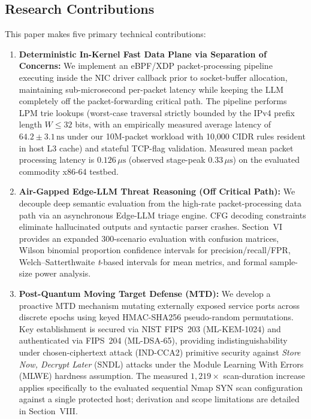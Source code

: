 \documentclass[journal]{IEEEtran}
\renewcommand{\_}{\textunderscore\allowbreak}
\begin{document}
\subsection{Research Contributions}
This paper makes five primary technical contributions:
\begin{enumerate}
  \item \textbf{Deterministic In-Kernel Fast Data Plane via Separation of Concerns:} We implement an
    eBPF/XDP packet-processing pipeline executing inside the NIC driver callback
    prior to socket-buffer allocation, maintaining sub-microsecond per-packet
    latency while keeping the LLM completely off the packet-forwarding critical path.
    The pipeline performs LPM trie lookups (worst-case traversal strictly bounded by the
    IPv4 prefix length $W \le 32$ bits, with an empirically measured average latency of
    $64.2 \pm 3.1\,\text{ns}$ under our 10M-packet workload with 10{,}000 CIDR rules resident
    in host L3 cache) and stateful TCP-flag validation. Measured mean packet processing
    latency is $0.126\,\mu\text{s}$ (observed stage-peak $0.33\,\mu\text{s}$) on the
    evaluated commodity x86-64 testbed.

  \item \textbf{Air-Gapped Edge-LLM Threat Reasoning (Off Critical Path):} We decouple deep semantic
    evaluation from the high-rate packet-processing data path via an asynchronous Edge-LLM triage
    engine. CFG decoding constraints eliminate hallucinated outputs and
    syntactic parser crashes. Section~VI provides an expanded 300-scenario evaluation
    with confusion matrices, Wilson binomial proportion confidence intervals for precision/recall/FPR,
    Welch--Satterthwaite \textit{t}-based intervals for mean metrics, and formal sample-size power analysis.

  \item \textbf{Post-Quantum Moving Target Defense (MTD):} We develop a proactive
    MTD mechanism mutating externally exposed service ports across discrete epochs
    using keyed HMAC-SHA256 pseudo-random permutations. Key establishment is secured
    via NIST FIPS~203 (ML-KEM-1024) and authenticated via FIPS~204 (ML-DSA-65),
    providing indistinguishability under chosen-ciphertext attack (IND-CCA2)
    primitive security against \emph{Store Now, Decrypt Later} (SNDL) attacks under the
    Module Learning With Errors (MLWE) hardness assumption. The measured $1{,}219\times$
    scan-duration increase applies specifically to the evaluated sequential Nmap
    SYN scan configuration against a single protected host; derivation and scope
    limitations are detailed in Section~VIII.


\end{enumerate}
\end{document}
